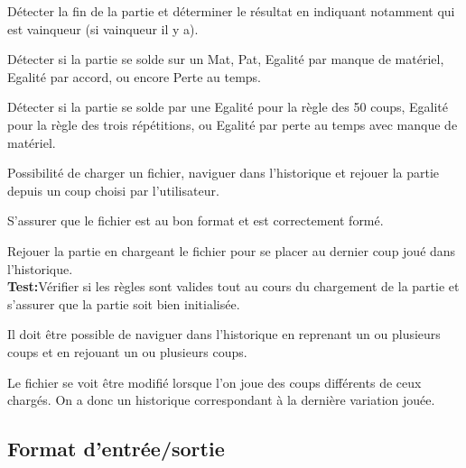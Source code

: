 \documentclass{article}
\begin{document}
\begin{needbox}
    Détecter la fin de la partie et déterminer le résultat en indiquant notamment qui est vainqueur (si vainqueur il y a).
    \begin{subneedbox}
        Détecter si la partie se solde sur un Mat, Pat, Egalité par manque de matériel, Egalité par accord, ou encore Perte au temps.
    \end{subneedbox}
    \begin{subneedbox}
        Détecter si la partie se solde par une Egalité pour la règle des 50 coups, Egalité pour la règle des trois répétitions,
        ou Egalité par perte au temps avec manque de matériel.
    \end{subneedbox}
\end{needbox}

\begin{needbox}
    Possibilité de charger un fichier, naviguer dans l'historique et rejouer la partie depuis un coup choisi par l'utilisateur.
    \begin{subneedbox}
        S'assurer que le fichier est au bon format et est correctement formé.
    \end{subneedbox}
    \begin{subneedbox}
        Rejouer la partie en chargeant le fichier pour se placer au dernier coup joué dans l'historique.\\
        \textbf{Test:}Vérifier si les règles sont valides tout au cours du chargement de la partie et s'assurer
        que la partie soit bien initialisée.
    \end{subneedbox}
    \begin{subneedbox}
        Il doit être possible de naviguer dans l'historique en reprenant un ou plusieurs coups et en rejouant
        un ou plusieurs coups.
    \end{subneedbox}
    \begin{subneedbox}
        Le fichier se voit être modifié lorsque l'on joue des coups différents de ceux chargés. On a donc un historique correspondant
        à la dernière variation jouée.
    \end{subneedbox}
\end{needbox}

\subsection{Format d'entrée/sortie}
\end{document}
